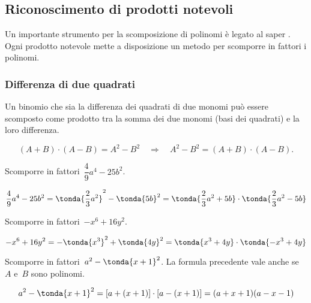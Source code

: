 % 


\subsection{Riconoscimento di prodotti notevoli}
\label{subsec:divpol_prodnot}

Un importante strumento per la scomposizione di polinomi è legato al saper 
.
Ogni prodotto notevole mette a disposizione un metodo per scomporre in 
fattori i polinomi.

\subsubsection{Differenza di due quadrati}
\label{subsubsec:divpol_difquad}

Un binomio che sia la differenza dei quadrati di due monomi può essere 
scomposto come prodotto tra la somma dei due monomi (basi dei quadrati) e 
la loro differenza.

\vspace{-1.0em}
\begin{equation*}
(A+B)\cdot (A-B)=
A^{2}-B^{2}\quad \Rightarrow \quad A^{2}-B^{2}=(A+B)\cdot (A-B).
\end{equation*}

\begin{esempio}{}{}
Scomporre in fattori~\(\dfrac{4}{9}a^{4}-25b^{2}\).

\vspace{-1.0em}
\[\dfrac{4}{9}a^{4}-25b^{2}=
  \tonda{\dfrac{2}{3}a^{2}}^{2}-\tonda{5b}^{2}=
  \tonda{\dfrac{2}{3}a^{2}+5b}\cdot \tonda{\dfrac{2}{3}a^{{2}}-5b}\]
\end{esempio}

\begin{esempio}{}{}
Scomporre in fattori~\(-x^6+16y^{2}\).

\vspace{-1.0em}
\[-x^6+16y^{2}=-\tonda{x^3}^{2}+\tonda{4y}^{2}=
  \tonda{x^3+4y}\cdot \tonda{-x^3+4y}\]
\end{esempio}

\begin{esempio}{}{}
Scomporre in fattori~\(a^{2}-\tonda{x+1}^{2}\).
La formula precedente vale anche se~\(A\) e~\(B\) sono polinomi. 

\vspace{-1.0em}
\[a^{2}-\tonda{x+1}^{2}=
 \left[a+(x+1)\right]\cdot \left[a-(x+1)\right]=(a+x+1)(a-x-1)\]
\end{esempio}


